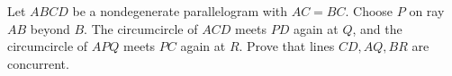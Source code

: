 Let $ ABCD $ be a nondegenerate parallelogram with $ AC=BC $. Choose $ P $ on ray $ AB $ beyond $ B $. The circumcircle of $ ACD $ meets $ PD $ again at $ Q $, and the circumcircle of $ APQ $ meets $ PC $ again at $ R $. Prove that lines $ CD,AQ,BR $ are concurrent.

